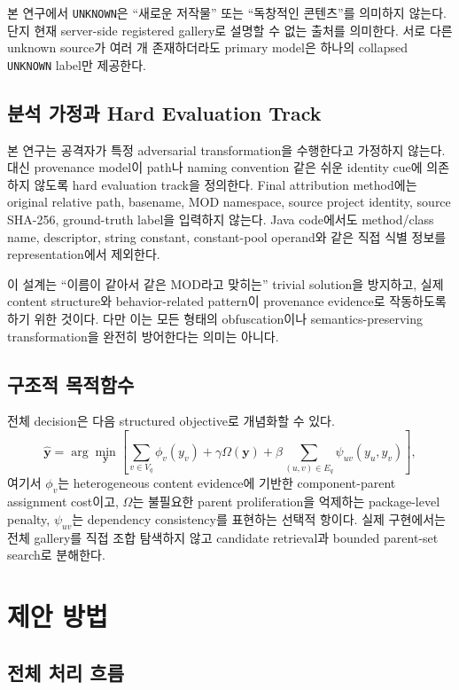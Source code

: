 \documentclass[runningheads]{llncs}
\begin{document}
본 연구에서 \texttt{UNKNOWN}은 ``새로운 저작물'' 또는 ``독창적인 콘텐츠''를 의미하지 않는다. 단지 현재 server-side registered gallery로 설명할 수 없는 출처를 의미한다. 서로 다른 unknown source가 여러 개 존재하더라도 primary model은 하나의 collapsed \texttt{UNKNOWN} label만 제공한다.

\subsection{분석 가정과 Hard Evaluation Track}

본 연구는 공격자가 특정 adversarial transformation을 수행한다고 가정하지 않는다. 대신 provenance model이 path나 naming convention 같은 쉬운 identity cue에 의존하지 않도록 hard evaluation track을 정의한다. Final attribution method에는 original relative path, basename, MOD namespace, source project identity, source SHA-256, ground-truth label을 입력하지 않는다. Java code에서도 method/class name, descriptor, string constant, constant-pool operand와 같은 직접 식별 정보를 representation에서 제외한다.

이 설계는 ``이름이 같아서 같은 MOD라고 맞히는'' trivial solution을 방지하고, 실제 content structure와 behavior-related pattern이 provenance evidence로 작동하도록 하기 위한 것이다. 다만 이는 모든 형태의 obfuscation이나 semantics-preserving transformation을 완전히 방어한다는 의미는 아니다.

\subsection{구조적 목적함수}

전체 decision은 다음 structured objective로 개념화할 수 있다.
\[
\hat{\mathbf y}=\arg\min_{\mathbf y}
\left[
\sum_{v\in V_q}\phi_v(y_v)
+\gamma\Omega(\mathbf y)
+\beta\sum_{(u,v)\in E_q}\psi_{uv}(y_u,y_v)
\right],
\]
여기서 \(\phi_v\)는 heterogeneous content evidence에 기반한 component-parent assignment cost이고, \(\Omega\)는 불필요한 parent proliferation을 억제하는 package-level penalty, \(\psi_{uv}\)는 dependency consistency를 표현하는 선택적 항이다. 실제 구현에서는 전체 gallery를 직접 조합 탐색하지 않고 candidate retrieval과 bounded parent-set search로 분해한다.

\section{제안 방법}

\subsection{전체 처리 흐름}
\end{document}
